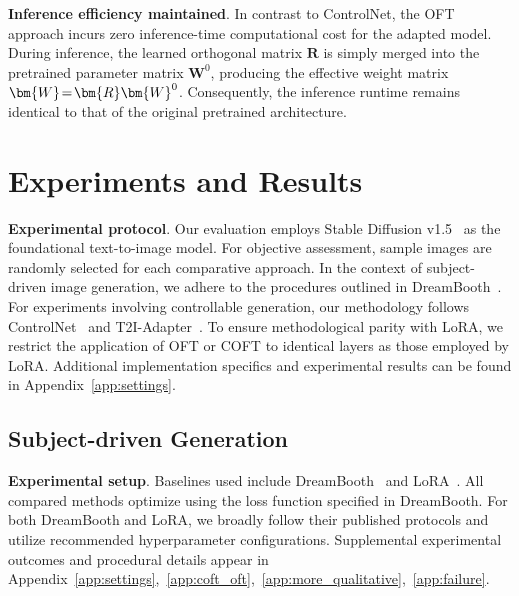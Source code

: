 \textbf{Inference efficiency maintained}. In contrast to ControlNet, the OFT approach incurs zero inference-time computational cost for the adapted model. During inference, the learned orthogonal matrix $\bm{R}$ is simply merged into the pretrained parameter matrix $\bm{W}^0$, producing the effective weight matrix $\thickmuskip=2mu \medmuskip=2mu \bm{W}=\bm{R}\bm{W}^0$. Consequently, the inference runtime remains identical to that of the original pretrained architecture.

\section{Experiments and Results}

\textbf{Experimental protocol}. Our evaluation employs Stable Diffusion v1.5~\cite{rombach2022high} as the foundational text-to-image model. For objective assessment, sample images are randomly selected for each comparative approach. In the context of subject-driven image generation, we adhere to the procedures outlined in DreamBooth~\cite{ruiz2023dreambooth}. For experiments involving controllable generation, our methodology follows ControlNet~\cite{zhang2023adding} and T2I-Adapter~\cite{mou2023t2i}. To ensure methodological parity with LoRA, we restrict the application of OFT or COFT to identical layers as those employed by LoRA. Additional implementation specifics and experimental results can be found in Appendix~\ref{app:settings}.

\subsection{Subject-driven Generation}

\textbf{Experimental setup}. Baselines used include DreamBooth~\cite{ruiz2023dreambooth} and LoRA~\cite{hulora2022}. All compared methods optimize using the loss function specified in DreamBooth. For both DreamBooth and LoRA, we broadly follow their published protocols and utilize recommended hyperparameter configurations. Supplemental experimental outcomes and procedural details appear in Appendix~\ref{app:settings},~\ref{app:coft_oft},~\ref{app:more_qualitative},~\ref{app:failure}.

